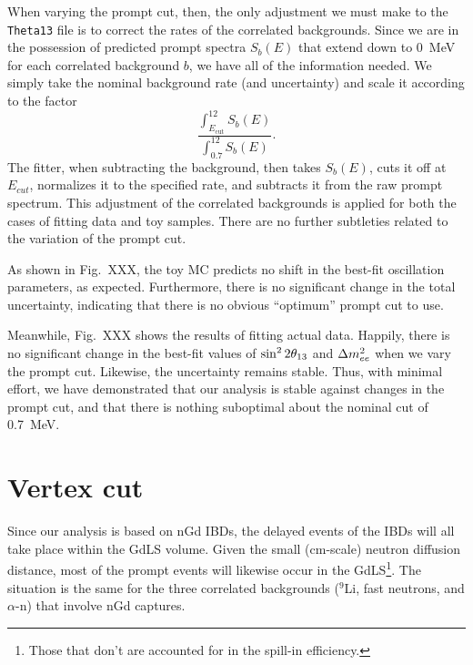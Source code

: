 \documentclass[../thesis.tex]{subfiles}
\begin{document}
When varying the prompt cut, then, the only adjustment we must make to the \texttt{Theta13} file is to correct the rates of the correlated backgrounds. Since we are in the possession of predicted prompt spectra $S_b(E)$ that extend down to 0~MeV for each correlated background $b$, we have all of the information needed. We simply take the nominal background rate (and uncertainty) and scale it according to the factor
\[
  \frac{\int_{E_{\mathrm{cut}}}^{12} S_b(E)}{\int_{0.7}^{12} S_b(E)}.
\]
The fitter, when subtracting the background, then takes $S_b(E)$, cuts it off at $E_{cut}$, normalizes it to the specified rate, and subtracts it from the raw prompt spectrum. This adjustment of the correlated backgrounds is applied for both the cases of fitting data and toy samples. There are no further subtleties related to the variation of the prompt cut.

As shown in Fig.~XXX, the toy MC predicts no shift in the best-fit oscillation parameters, as expected. Furthermore, there is no significant change in the total uncertainty, indicating that there is no obvious ``optimum'' prompt cut to use.

Meanwhile, Fig.~XXX shows the results of fitting actual data. Happily, there is no significant change in the best-fit values of $\sin^2 2\theta_{13}$ and $\Delta m^2_{ee}$ when we vary the prompt cut. Likewise, the uncertainty remains stable. Thus, with minimal effort, we have demonstrated that our analysis is stable against changes in the prompt cut, and that there is nothing suboptimal about the nominal cut of 0.7~MeV.

\section{Vertex cut}
\label{sec:cutVaryVertexCut}

\begin{comment}
  XXX Do our adjustments of background rates account for the fact that some backgrounds can occur in the GdLS+LS whereas others occur only in GdLS?

Accidentals -- Handled automatically, no adjustment, we're good
Li9, fast-n, alpha-n: Only in GdLS, ???
AmC: Both. R distribution unknown but probably ``lumpy''. Z probably like what we did.
\end{comment}

Since our analysis is based on nGd IBDs, the delayed events of the IBDs will all take place within the GdLS volume. Given the small (cm-scale) neutron diffusion distance, most of the prompt events will likewise occur in the GdLS\footnote{Those that don't are accounted for in the spill-in efficiency.}. The situation is the same for the three correlated backgrounds ($^9$Li, fast neutrons, and $\alpha$-n) that involve nGd captures.
\end{document}
